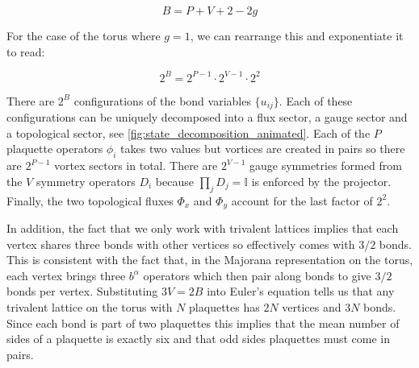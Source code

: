 \[B = P + V + 2 - 2g\]

For the case of the torus where \(g = 1\), we can rearrange this and exponentiate it to read:

\[2^B = 2^{P-1}\cdot 2^{V-1} \cdot 2^2\]

There are \(2^B\) configurations of the bond variables \(\{u_{ij}\}\). Each of these configurations can be uniquely decomposed into a flux sector, a gauge sector and a topological sector, see \cref{fig:state_decomposition_animated}. Each of the \(P\) plaquette operators \(\phi_i\) takes two values but vortices are created in pairs so there are \(2^{P-1}\) vortex sectors in total. There are \(2^{V-1}\) gauge symmetries formed from the \(V\) symmetry operators \(D_i\) because \(\prod_{j} D_j = \mathbb{I}\) is enforced by the projector. Finally, the two topological fluxes \(\Phi_x\) and \(\Phi_y\) account for the last factor of \(2^2\).

In addition, the fact that we only work with trivalent lattices implies that each vertex shares three bonds with other vertices so effectively comes with \(3/2\) bonds. This is consistent with the fact that, in the Majorana representation on the torus, each vertex brings three \(b^\alpha\) operators which then pair along bonds to give \(3/2\) bonds per vertex. Substituting \(3V = 2B\) into Euler's equation tells us that any trivalent lattice on the torus with \(N\) plaquettes has \(2N\) vertices and \(3N\) bonds. Since each bond is part of two plaquettes this implies that the mean number of sides of a plaquette is exactly six and that odd sides plaquettes must come in pairs.
